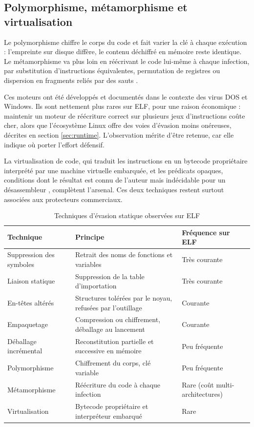 \subsection{Polymorphisme, métamorphisme et virtualisation}

Le polymorphisme chiffre le corps du code et fait varier la clé à chaque exécution : l'empreinte sur disque diffère, le contenu déchiffré en mémoire reste identique. Le métamorphisme va plus loin en réécrivant le code lui-même à chaque infection, par substitution d'instructions équivalentes, permutation de registres ou dispersion en fragments reliés par des sauts \cite{szor2005}.

Ces moteurs ont été développés et documentés dans le contexte des virus DOS et Windows. Ils sont nettement plus rares sur ELF, pour une raison économique : maintenir un moteur de réécriture correct sur plusieurs jeux d'instructions coûte cher, alors que l'écosystème Linux offre des voies d'évasion moins onéreuses, décrites en section \ref{sec:runtime}. L'observation mérite d'être retenue, car elle indique où porter l'effort défensif.

La virtualisation de code, qui traduit les instructions en un bytecode propriétaire interprété par une machine virtuelle embarquée, et les prédicats opaques, conditions dont le résultat est connu de l'auteur mais indécidable pour un désassembleur \cite{collberg1997}, complètent l'arsenal. Ces deux techniques restent surtout associées aux protecteurs commerciaux.

\begin{table}[h!]
\centering
\caption{Techniques d'évasion statique observées sur ELF}
\label{tab:evasion-statique}
\begin{tabular}{|l|p{5.5cm}|p{3.5cm}|}
\hline
Technique & Principe & Fréquence sur ELF \\
\hline
Suppression des symboles & Retrait des noms de fonctions et variables & Très courante \\
\hline
Liaison statique & Suppression de la table d'importation & Très courante \\
\hline
En-têtes altérés & Structures tolérées par le noyau, refusées par l'outillage & Courante \\
\hline
Empaquetage & Compression ou chiffrement, déballage au lancement & Courante \\
\hline
Déballage incrémental & Reconstitution partielle et successive en mémoire & Peu fréquente \\
\hline
Polymorphisme & Chiffrement du corps, clé variable & Peu fréquente \\
\hline
Métamorphisme & Réécriture du code à chaque infection & Rare (coût multi-architectures) \\
\hline
Virtualisation & Bytecode propriétaire et interpréteur embarqué & Rare \\
\hline
\end{tabular}
\end{table}

